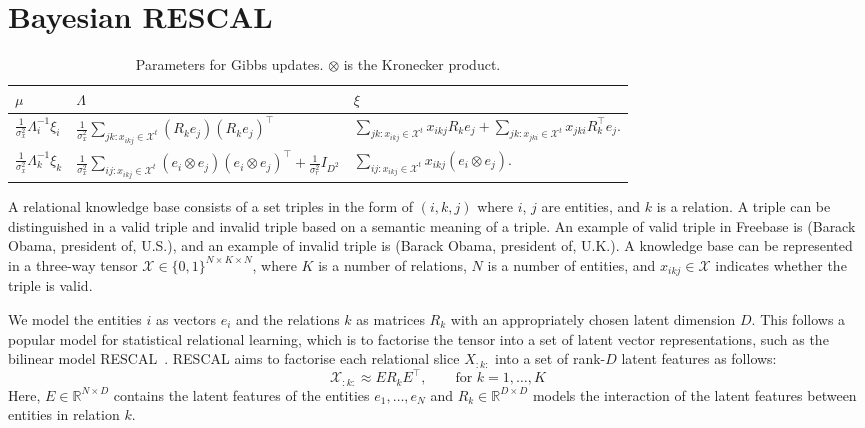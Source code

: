 \section{Bayesian RESCAL}

\begin{table*}[bt]
\caption{Parameters for Gibbs updates. $\otimes$ is the Kronecker product.}
\label{tab:brescalposterior}
\begin{tabu}{l|l|l}
$\mu$&$\Lambda$&$\xi$\\
\hline
$\frac{1}{\sigma_x^2}\Lambda_i^{-1}\xi_i$&
$\frac{1}{\sigma_x^2} \sum_{jk : x_{ikj} \in \mathcal{X}^{t}} (R_k e_j)(R_k e_j)^\top$&
$\sum_{jk : x_{ikj} \in \mathcal{X}^{t}}  x_{ikj} R_{k} e_{j} +
\sum_{jk : x_{jki} \in \mathcal{X}^{t}} x_{jki} R_{k}^\top e_{j}.$
\\
$\frac{1}{\sigma_x^2}\Lambda_k^{-1}\xi_k$&
$\frac{1}{\sigma_x^2} \sum_{ij:x_{ikj} \in \mathcal{X}^{t}} (e_i
\otimes e_j)(e_i \otimes e_j)^\top + \frac{1}{\sigma_r^2} {I}_{D^2}$&
$\sum_{ij:x_{ikj} \in \mathcal{X}^{t}} x_{ikj} (e_{i} \otimes e_{j}).$
\end{tabu}
\end{table*}


A relational knowledge base consists of a set triples in the form of $(i, k, j)$
where $i$, $j$ are entities, and $k$ is a relation. A triple can be distinguished
in a valid triple and invalid triple based on a semantic meaning of a triple. An
example of valid triple in Freebase is (Barack Obama, president of, U.S.), and an
example of invalid triple is (Barack Obama, president of, U.K.).
A knowledge base can be represented in a three-way tensor
$\mathcal{X} \in \{0, 1\}^{N \times K \times N}$, where $K$ is a number of
relations, $N$ is a number of entities, and $x_{ikj}\in\mathcal{X}$ indicates whether
the triple is valid.

We model the entities $i$ as vectors $e_i$ and the relations $k$ as matrices $R_k$ with an
appropriately chosen latent dimension $D$. This follows a popular model
for statistical relational learning, which is to factorise the tensor into a
set of latent vector representations, such as the bilinear model RESCAL~\cite{nickel2011three}.
RESCAL aims to factorise each relational slice $X_{:k:}$ into a set of rank-$D$ latent
features as follows:
\[
  \mathcal{X}_{:k:} \approx E R_k E^\top, \qquad \text{for } k = 1, \dots, K
\]
Here, $E\in {\mathbb R}^{N \times D}$ contains the latent features of the
entities $e_1, \ldots, e_N$ and $R_k\in {\mathbb R}^{D \times D}$ models the interaction of the
latent features between entities in relation $k$.

